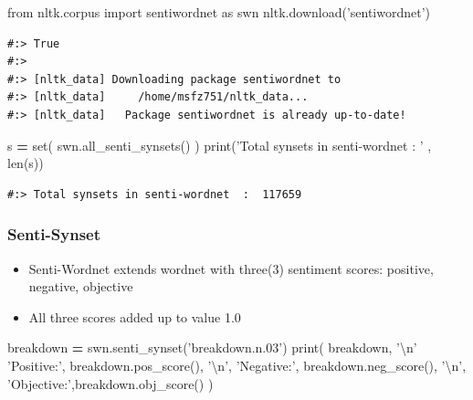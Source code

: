 \documentclass[
]{book}
\newenvironment{Shaded}{\begin{snugshade}}{\end{snugshade}}
\newcommand{\BuiltInTok}[1]{#1}
\newcommand{\CharTok}[1]{\textcolor[rgb]{0.5,0.5,0.5}{#1}}
\newcommand{\ImportTok}[1]{#1}
\newcommand{\NormalTok}[1]{#1}
\newcommand{\OperatorTok}[1]{\textcolor[rgb]{0.43,0.43,0.43}{\textbf{#1}}}
\newcommand{\StringTok}[1]{\textcolor[rgb]{0.5,0.5,0.5}{#1}}
\providecommand{\tightlist}{%
  \setlength{\itemsep}{0pt}\setlength{\parskip}{0pt}}
\begin{document}
\begin{Shaded}
\begin{Highlighting}[]
\ImportTok{from}\NormalTok{ nltk.corpus }\ImportTok{import}\NormalTok{ sentiwordnet }\ImportTok{as}\NormalTok{ swn}
\NormalTok{nltk.download(}\StringTok{'sentiwordnet'}\NormalTok{)}
\end{Highlighting}
\end{Shaded}

\begin{verbatim}
#:> True
#:> 
#:> [nltk_data] Downloading package sentiwordnet to
#:> [nltk_data]     /home/msfz751/nltk_data...
#:> [nltk_data]   Package sentiwordnet is already up-to-date!
\end{verbatim}

\begin{Shaded}
\begin{Highlighting}[]
\NormalTok{s }\OperatorTok{=} \BuiltInTok{set}\NormalTok{( swn.all_senti_synsets() )}
\BuiltInTok{print}\NormalTok{(}\StringTok{'Total synsets in senti-wordnet  : '}\NormalTok{ ,   }\BuiltInTok{len}\NormalTok{(s))}
\end{Highlighting}
\end{Shaded}

\begin{verbatim}
#:> Total synsets in senti-wordnet  :  117659
\end{verbatim}

\hypertarget{senti-synset}{%
\subsubsection{Senti-Synset}\label{senti-synset}}

\begin{itemize}
\tightlist
\item
  Senti-Wordnet extends wordnet with three(3) sentiment scores: positive, negative, objective\\
\item
  All three scores added up to value 1.0
\end{itemize}

\begin{Shaded}
\begin{Highlighting}[]
\NormalTok{breakdown }\OperatorTok{=}\NormalTok{ swn.senti_synset(}\StringTok{'breakdown.n.03'}\NormalTok{)}
\BuiltInTok{print}\NormalTok{(}
\NormalTok{  breakdown, }\StringTok{'}\CharTok{\textbackslash{}n}\StringTok{'}
  \StringTok{'Positive:'}\NormalTok{, breakdown.pos_score(), }\StringTok{'}\CharTok{\textbackslash{}n}\StringTok{'}\NormalTok{,}
  \StringTok{'Negative:'}\NormalTok{, breakdown.neg_score(), }\StringTok{'}\CharTok{\textbackslash{}n}\StringTok{'}\NormalTok{,}
  \StringTok{'Objective:'}\NormalTok{,breakdown.obj_score()}
\NormalTok{)}
\end{Highlighting}
\end{Shaded}
\end{document}
